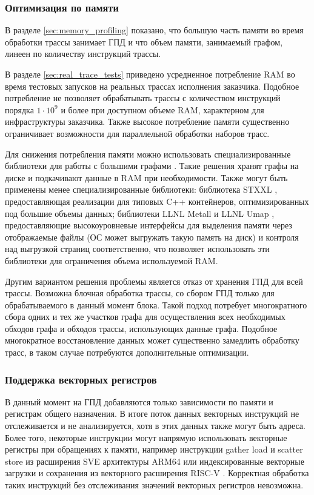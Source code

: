 \subsubsection{Оптимизация по памяти}

В разделе \ref{sec:memory_profiling} показано, что большую часть памяти во время обработки трассы занимает ГПД и что объем памяти, занимаемый графом, линеен по количеству инструкций трассы.

В разделе \ref{sec:real_trace_tests} приведено усредненное потребление RAM во время тестовых запусков на реальных трассах исполнения заказчика. Подобное потребление не позволяет обрабатывать трассы с количеством инструкций порядка $1\cdot10^{9}$ и более при доступном объеме RAM, характерном для инфраструктуры заказчика. Также высокое потребление памяти существенно ограничивает возможности для параллельной обработки наборов трасс.

Для снижения потребления памяти можно использовать специализированные библиотеки для работы с большими графами \cite{graphchi}. Такие решения хранят графы на диске и подкачивают данные в RAM при необходимости. Также могут быть применены менее специализированные библиотеки: библиотека STXXL \cite{stxxl}, предоставляющая реализации для типовых C++ контейнеров, оптимизированных под большие объемы данных; библиотеки LLNL Metall \cite{llnl_metall} и LLNL Umap \cite{llnl_umap}, предоставляющие высокоуровневые интерфейсы для выделения памяти через отображаемые файлы (ОС может выгружать такую память на диск) и контроля над выгрузкой страниц соответственно, что позволяет использовать эти библиотеки для ограничения объема используемой RAM.

Другим вариантом решения проблемы является отказ от хранения ГПД для всей трассы. Возможна блочная обработка трассы, со сбором ГПД только для обрабатываемого в данный момент блока. Такой подход потребует многократного сбора одних и тех же участков графа для осуществления всех необходимых обходов графа и обходов трассы, использующих данные графа. Подобное многократное восстановление данных может существенно замедлить обработку трасс, в таком случае потребуются дополнительные оптимизации.

\subsubsection{Поддержка векторных регистров}

В данный момент на ГПД добавляются только зависимости по памяти и регистрам общего назначения. В итоге поток данных векторных инструкций не отслеживается и не анализируется, хотя в этих данных также могут быть адреса. Более того, некоторые инструкции могут напрямую использовать векторные регистры при обращениях к памяти, например инструкции gather load и scatter store из расширения SVE архитектуры ARM64 или индексированные векторные загрузки и сохранения из векторного расширения RISC-V \cite{arm_sve_introduction,riscv_vector_extension}. Корректная обработка таких инструкций без отслеживания значений векторных регистров невозможна.

